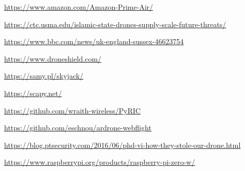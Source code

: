 \documentclass[conference,a4paper]{IEEEtran}
\begin{document}
\begin{thebibliography}{1}
    \url{https://www.amazon.com/Amazon-Prime-Air/}

    \url{https://ctc.usma.edu/islamic-state-drones-supply-scale-future-threats/}

    \url{https://www.bbc.com/news/uk-england-sussex-46623754}

    \url{https://www.droneshield.com/}

    \url{https://samy.pl/skyjack/}

    \url{https://scapy.net/}

    \url{https://github.com/wraith-wireless/PyRIC}

    \url{https://github.com/eschnou/ardrone-webflight}

    \url{https://blog.ptsecurity.com/2016/06/phd-vi-how-they-stole-our-drone.html}

    \url{https://www.raspberrypi.org/products/raspberry-pi-zero-w/}

\end{thebibliography}
\end{document}
